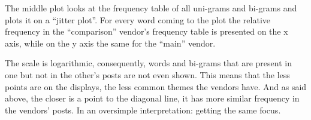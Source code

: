 \documentclass[]{article}
\newenvironment{Shaded}{\begin{snugshade}}{\end{snugshade}}
\newcommand{\KeywordTok}[1]{\textcolor[rgb]{0.13,0.29,0.53}{\textbf{{#1}}}}
\newcommand{\DataTypeTok}[1]{\textcolor[rgb]{0.13,0.29,0.53}{{#1}}}
\newcommand{\DecValTok}[1]{\textcolor[rgb]{0.00,0.00,0.81}{{#1}}}
\newcommand{\FloatTok}[1]{\textcolor[rgb]{0.00,0.00,0.81}{{#1}}}
\newcommand{\StringTok}[1]{\textcolor[rgb]{0.31,0.60,0.02}{{#1}}}
\newcommand{\NormalTok}[1]{{#1}}
\begin{document}
\begin{Shaded}
\end{Shaded}

The middle plot looks at the frequency table of all uni-grams and
bi-grams and plots it on a ``jitter plot''. For every word coming to the
plot the relative frequency in the ``comparison'' vendor's frequency
table is presented on the x axis, while on the y axis the same for the
``main'' vendor.

The scale is logarithmic, consequently, words and bi-grams that are
present in one but not in the other's posts are not even shown. This
means that the less points are on the displays, the less common themes
the vendors have. And as said above, the closer is a point to the
diagonal line, it has more similar frequency in the vendors' posts. In
an oversimple interpretation: getting the same focus.
\end{document}
